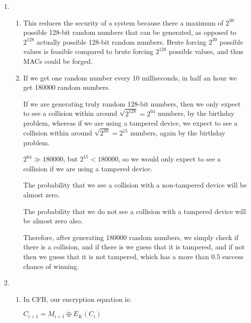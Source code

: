 


\begin{enumerate}[label=(\alph*)]

  \item
    \begin{enumerate}[label=(\roman*)]

      \item

        This reduces the security of a system because there a maximum of $2^{30}$ possible 128-bit random numbers that can be generated, as opposed to $2^{128}$ actually possible 128-bit random numbers. Brute forcing $2^{30}$ possible values is feasible compared to brute forcing $2^{128}$ possible values, and thus MACs could be forged.

        \item

          If we get one random number every 10 milliseconds, in half an hour we get 180000 random numbers.

          If we are generating truly random 128-bit numbers, then we only expect to see a collision within around $\sqrt{2^{128}} = 2^{64}$ numbers, by the birthday problem, whereas if we are using a tampered device, we expect to see a collision within around $\sqrt{2^{30}} = 2^{15}$ numbers, again by the birthday problem.

          $2^{64} \gg 180000$, but $2^{15} < 180000$, so we would only expect to see a collision if we are using a tampered device.

          The probability that we see a collision with a non-tampered device will be almost zero.

          The probability that we do not see a collision with a tampered device will be almost zero also.

          Therefore, after generating 180000 random numbers, we simply check if there is a collision, and if there is we guess that it is tampered, and if not then we guess that it is not tampered, which has a more than 0.5 success chance of winning.
    \end{enumerate}

    \item
      \begin{enumerate}[label=(\roman*)]

        \item
          In CFB, our encryption equation is:

          $C_{i+1} = M_{i+1} \oplus E_K(C_{i})$


\end{enumerate}
\end{enumerate}
